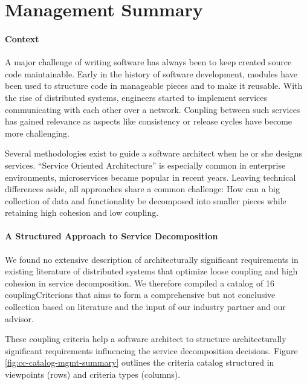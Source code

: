 \chapter{Management Summary}


\subsubsection{Context}

A major challenge of writing software has always been to keep created source code maintainable. Early in the history of software development, modules have been used to structure code in manageable pieces and to make it reusable. With the rise of distributed systems, engineers started to implement services communicating with each other over a network. Coupling between such services has gained relevance as aspects like consistency or release cycles have become more challenging.

Several methodologies exist to guide a software architect when he or she designs services. \enquote{Service Oriented Architecture} is especially common in enterprise environments, microservices became popular in recent years. Leaving technical differences aside, all approaches share a common challenge: How can a big collection of data and functionality be decomposed into smaller pieces while retaining high cohesion and low coupling.

\subsubsection{A Structured Approach to Service Decomposition}

We found no extensive description of architecturally significant requirements in existing literature of distributed systems that optimize loose coupling and high cohesion in service decomposition. We therefore compiled a catalog of 16 \glspl{couplingCriterion} that aims to form a comprehensive but not conclusive collection based on literature and the input of our industry partner and our advisor. 

These coupling criteria help a software architect to structure architecturally significant requirements influencing the service decomposition decisions. Figure \ref{fig:cc-catalog-mgmt-summary} outlines the criteria catalog structured in viewpoints (rows) and criteria types (columns).
 

